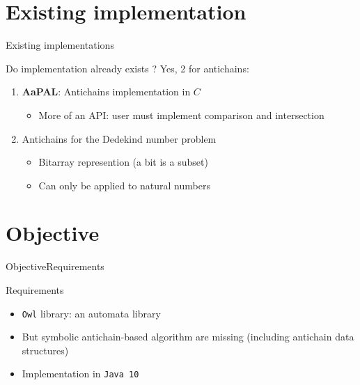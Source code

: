 \documentclass[10pt]{beamer}
\begin{document}
\section{Existing implementation}

\begin{frame}{Existing implementations}
    \begin{block}{Do implementation already exists ?}
        Yes, 2 for antichains:
        \begin{enumerate}
            \item \textbf{AaPAL}\cite{aapal}: Antichains implementation in $C$
            \begin{itemize}
                \item More of an API: user must implement
                comparison and intersection
            \end{itemize}
            \item Antichains for the Dedekind number problem
            \cite{hoedt}
            \begin{itemize}
                \item Bitarray represention (a bit is a subset)
                \item Can only be applied to natural numbers
            \end{itemize}

        \end{enumerate}
    \end{block}
\end{frame}

\section{Objective}

\begin{frame}{Objective}{Requirements}
    \begin{block}{Requirements}
        \begin{itemize}
            \item \texttt{Owl} library: an automata library
            \item But symbolic antichain-based algorithm are missing
            (including antichain data structures)
            \item Implementation in \texttt{Java 10}
        \end{itemize}

    \end{block}
\end{frame}
\end{document}
